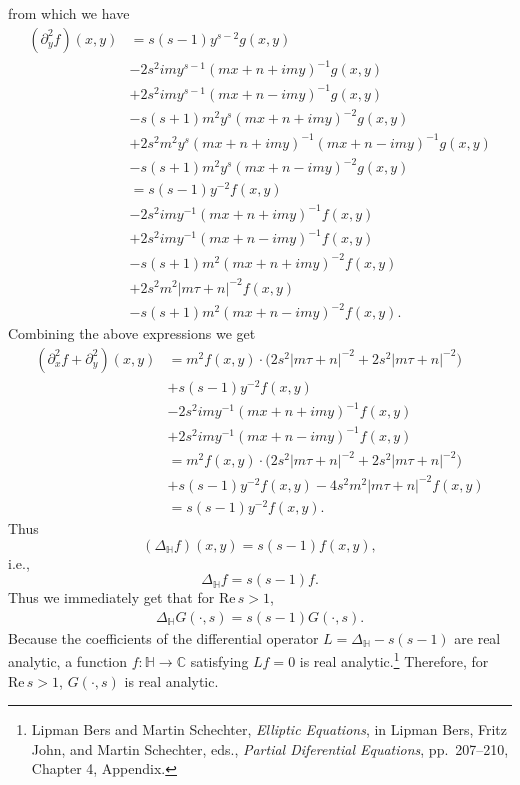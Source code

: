 \documentclass{article}
\def\Re{\ensuremath{\mathrm{Re}}\,}
\theoremstyle{definition}
\theoremstyle{definition}
\begin{document}
from which we have
\begin{align*}
(\partial_y^2 f)(x,y)&=s(s-1)y^{s-2} g(x,y)\\
&-2s^2 im y^{s-1}(mx+n+imy)^{-1} g(x,y)\\
&+2s^2 im y^{s-1} (mx+n-imy)^{-1} g(x,y)\\
&-s(s+1)m^2 y^s (mx+n+imy)^{-2} g(x,y)\\
&+2s^2m^2y^s(mx+n+imy)^{-1}(mx+n-imy)^{-1} g(x,y)\\
&-s(s+1)m^2 y^s(mx+n-imy)^{-2} g(x,y)\\
&=s(s-1) y^{-2} f(x,y)\\
&-2s^2imy^{-1} (mx+n+imy)^{-1} f(x,y)\\
&+2s^2imy^{-1}(mx+n-imy)^{-1} f(x,y)\\
&-s(s+1)m^2(mx+n+imy)^{-2} f(x,y)\\
&+2s^2m^2 |m\tau+n|^{-2} f(x,y)\\
&-s(s+1)m^2 (mx+n-imy)^{-2} f(x,y).
\end{align*}
Combining the above expressions we get
\begin{align*}
(\partial_x^2 f+\partial_y^2)(x,y)&=m^2 f(x,y) \cdot \bigg(2s^2|m\tau+n|^{-2}
+2s^2|m\tau+n|^{-2}\bigg)\\
&+s(s-1)y^{-2} f(x,y)\\
&-2s^2imy^{-1} (mx+n+imy)^{-1} f(x,y)\\
&+2s^2imy^{-1}(mx+n-imy)^{-1} f(x,y)\\
&=m^2 f(x,y) \cdot \bigg(2s^2|m\tau+n|^{-2}
+2s^2|m\tau+n|^{-2}\bigg)\\
&+s(s-1)y^{-2}f(x,y)
-4s^2m^2|m\tau+n|^{-2} f(x,y)\\
&=s(s-1)y^{-2}f(x,y).
\end{align*}
Thus
\[
(\Delta_{\mathbb{H}} f)(x,y) = s(s-1)f(x,y),
\]
i.e.,
\[
\Delta_{\mathbb{H}} f = s(s-1)f.
\]
Thus we immediately get that for $\Re s>1$,
\begin{align*}
\Delta_{\mathbb{H}} G(\cdot,s) = s(s-1) G(\cdot,s).
\end{align*}
Because the coefficients of the differential operator $L=\Delta_{\mathbb{H}}-s(s-1)$ are real analytic, a function $f:\mathbb{H} \to \mathbb{C}$
satisfying $Lf=0$ is real analytic.\footnote{Lipman Bers and Martin Schechter, {\em Elliptic Equations}, in
Lipman Bers, Fritz John, and Martin Schechter, eds., {\em Partial Diferential Equations},
pp.~207--210, Chapter 4, Appendix.} Therefore, for $\Re s>1$, $G(\cdot,s)$ is real analytic.
\end{document}

